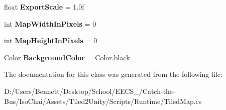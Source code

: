 \begin{DoxyCompactItemize}
\mbox{\label{class_tiled2_unity_1_1_tiled_map_a608dfffdbb33b68d4f810e4e0c1e97c4}} 
float {\bfseries Export\+Scale} = 1.\+0f
\item 
\mbox{\label{class_tiled2_unity_1_1_tiled_map_aa494770e2f38b482a4adee6990e687ab}} 
int {\bfseries Map\+Width\+In\+Pixels} = 0
\item 
\mbox{\label{class_tiled2_unity_1_1_tiled_map_a6a10e2ec0f364481ae2268ab8bb40941}} 
int {\bfseries Map\+Height\+In\+Pixels} = 0
\item 
\mbox{\label{class_tiled2_unity_1_1_tiled_map_aa3ec5f9703ec523511b17561fa736eda}} 
Color {\bfseries Background\+Color} = Color.\+black
\end{DoxyCompactItemize}


The documentation for this class was generated from the following file\+:\begin{DoxyCompactItemize}
\item 
D\+:/\+Users/\+Bennett/\+Desktop/\+School/\+E\+E\+C\+S\+\_/\+Catch-\/the-\/\+Bus/\+Iso\+Chai/\+Assets/\+Tiled2\+Unity/\+Scripts/\+Runtime/Tiled\+Map.\+cs\end{DoxyCompactItemize}
